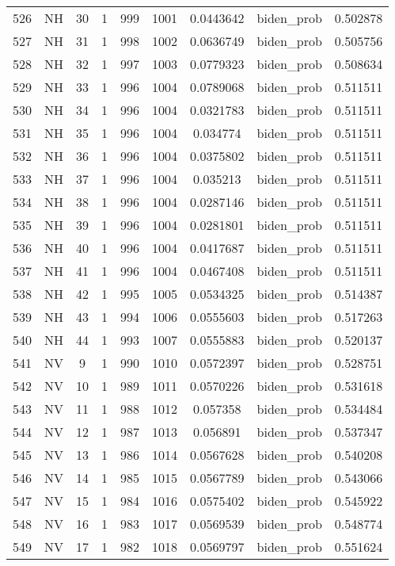 \documentclass[12pt,a4paper]{article}
\begin{document}
\begin{tabular}{r|cccccccc}
	526 & NH & 30 & 1 & 999 & 1001 & 0.0443642 & biden\_prob & 0.502878 \\
	527 & NH & 31 & 1 & 998 & 1002 & 0.0636749 & biden\_prob & 0.505756 \\
	528 & NH & 32 & 1 & 997 & 1003 & 0.0779323 & biden\_prob & 0.508634 \\
	529 & NH & 33 & 1 & 996 & 1004 & 0.0789068 & biden\_prob & 0.511511 \\
	530 & NH & 34 & 1 & 996 & 1004 & 0.0321783 & biden\_prob & 0.511511 \\
	531 & NH & 35 & 1 & 996 & 1004 & 0.034774 & biden\_prob & 0.511511 \\
	532 & NH & 36 & 1 & 996 & 1004 & 0.0375802 & biden\_prob & 0.511511 \\
	533 & NH & 37 & 1 & 996 & 1004 & 0.035213 & biden\_prob & 0.511511 \\
	534 & NH & 38 & 1 & 996 & 1004 & 0.0287146 & biden\_prob & 0.511511 \\
	535 & NH & 39 & 1 & 996 & 1004 & 0.0281801 & biden\_prob & 0.511511 \\
	536 & NH & 40 & 1 & 996 & 1004 & 0.0417687 & biden\_prob & 0.511511 \\
	537 & NH & 41 & 1 & 996 & 1004 & 0.0467408 & biden\_prob & 0.511511 \\
	538 & NH & 42 & 1 & 995 & 1005 & 0.0534325 & biden\_prob & 0.514387 \\
	539 & NH & 43 & 1 & 994 & 1006 & 0.0555603 & biden\_prob & 0.517263 \\
	540 & NH & 44 & 1 & 993 & 1007 & 0.0555883 & biden\_prob & 0.520137 \\
	541 & NV & 9 & 1 & 990 & 1010 & 0.0572397 & biden\_prob & 0.528751 \\
	542 & NV & 10 & 1 & 989 & 1011 & 0.0570226 & biden\_prob & 0.531618 \\
	543 & NV & 11 & 1 & 988 & 1012 & 0.057358 & biden\_prob & 0.534484 \\
	544 & NV & 12 & 1 & 987 & 1013 & 0.056891 & biden\_prob & 0.537347 \\
	545 & NV & 13 & 1 & 986 & 1014 & 0.0567628 & biden\_prob & 0.540208 \\
	546 & NV & 14 & 1 & 985 & 1015 & 0.0567789 & biden\_prob & 0.543066 \\
	547 & NV & 15 & 1 & 984 & 1016 & 0.0575402 & biden\_prob & 0.545922 \\
	548 & NV & 16 & 1 & 983 & 1017 & 0.0569539 & biden\_prob & 0.548774 \\
	549 & NV & 17 & 1 & 982 & 1018 & 0.0569797 & biden\_prob & 0.551624 \\

\end{tabular}
\end{document}
